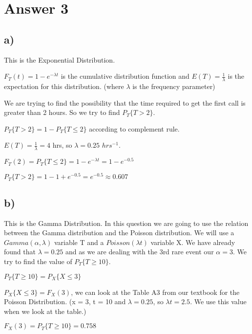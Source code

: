 \documentclass[12pt]{article}
\begin{document}
\section*{Answer 3}
\subsection*{a)}
This is the Exponential Distribution.\\ \par 
$F_T(t) = 1 - e^{-\lambda t}$ is the cumulative distribution function and $E(T) = \frac{1}{\lambda}$ is the expectation for this distribution. (where $\lambda$ is the frequency parameter)\\ \par 
We are trying to find the possibility that the time required to get the first call is greater than 2 hours. So we try to find $P_T\lbrace T > 2\rbrace$.\\ \par 
$P_T\lbrace T > 2 \rbrace = 1 - P_T \lbrace T \leq 2 \rbrace$ according to complement rule.\\ \par 
$E(T) = \frac{1}{\lambda} = 4$ hrs, so $\lambda = 0.25$ $hrs^{-1}$.\\ \par 
$F_T(2) = P_T\lbrace T \leq 2 \rbrace = 1 - e^{-\lambda t} = 1 - e^{-0.5}$\\ \par 
$P_T\lbrace T > 2 \rbrace = 1 - 1 + e^{-0.5} = e^{-0.5} \approx 0.607$
\subsection*{b)}
This is the Gamma Distribution. In this question we are going to use the relation between the Gamma distribution and the Poisson distribution. We will use a $Gamma(\alpha , \lambda)$ variable T and a $Poisson(\lambda t)$ variable X. We have already found that $\lambda = 0.25$ and as we are dealing with the 3rd rare event our $\alpha = 3$. We try to find the value of $P_T\lbrace T \geq 10 \rbrace$.\\ \par 
$P_T\lbrace T \geq 10 \rbrace = P_X \lbrace X \leq 3\rbrace$\\ \par 
$P_X\lbrace X \leq 3 \rbrace = F_X(3)$, we can look at the Table A3 from our textbook for the Poisson Distribution. (x = 3, t = 10 and $\lambda = 0.25$, so $\lambda t = 2.5$. We use this value when we look at the table.)\\ \par 
$F_X(3) = P_T \lbrace T \geq 10 \rbrace = 0.758$
\end{document}
